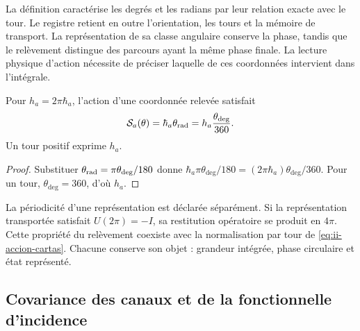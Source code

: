 La définition caractérise les degrés et les radians par leur relation exacte
avec le tour. Le registre retient en outre l’orientation, les tours et la
mémoire de transport. La représentation de sa classe angulaire conserve
la phase, tandis que le relèvement distingue des parcours ayant la même
phase finale. La lecture physique d’action nécessite de préciser laquelle de
ces coordonnées intervient dans l’intégrale.

\begin{proposition}
Pour \(h_a=2\pi\hbar_a\), l'action d'une coordonnée relevée
satisfait
\begin{equation}
 \mathcal S_a(\theta)
 =\hbar_a\theta_{\rm rad}
 =h_a\frac{\theta_{\deg}}{360}.
 \label{eq:ii-accion-cartas}
\end{equation}
Un tour positif exprime \(h_a\).
\end{proposition}
\begin{proof}
Substituer \(\theta_{\rm rad}=\pi\theta_{\deg}/180\) donne
\(\hbar_a\pi\theta_{\deg}/180
=(2\pi\hbar_a)\theta_{\deg}/360\). Pour un tour,
\(\theta_{\deg}=360\), d'où \(h_a\).
\end{proof}

La périodicité d'une représentation est déclarée séparément. Si la
représentation transportée satisfait \(U(2\pi)=-I\), sa restitution
opératoire se produit en \(4\pi\). Cette propriété du relèvement
coexiste avec la normalisation par tour de
\eqref{eq:ii-accion-cartas}. Chacune conserve son objet : grandeur
intégrée, phase circulaire et état représenté.

\subsection{Covariance des canaux et de la fonctionnelle d'incidence}

